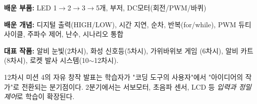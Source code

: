\begin{summary}[1분기 12차시 총정리]
\textbf{배운 부품:} LED 1$\to$2$\to$3$\to$5개, 부저, DC모터(회전/PWM/바퀴)

\textbf{배운 개념:} 디지털 출력(HIGH/LOW), 시간 지연, 순차, 반복(for/while),
PWM 듀티 사이클, 주파수 제어, 난수, 시나리오 통합

\textbf{대표 작품:} 알비 눈빛(2차시), 화성 신호등(5차시), 가위바위보 게임
(6차시), 알비 카트(8차시), 로켓 발사 시스템(10$\sim$12차시).

12차시 미션 4의 자유 창작 발표는 학습자가 "코딩 도구의 사용자"에서
"아이디어의 작가"로 전환되는 분기점이다. 2분기에서는 서보모터, 초음파
센서, LCD 등 \emph{입력과 정밀 제어}로 학습이 확장된다.
\end{summary}
